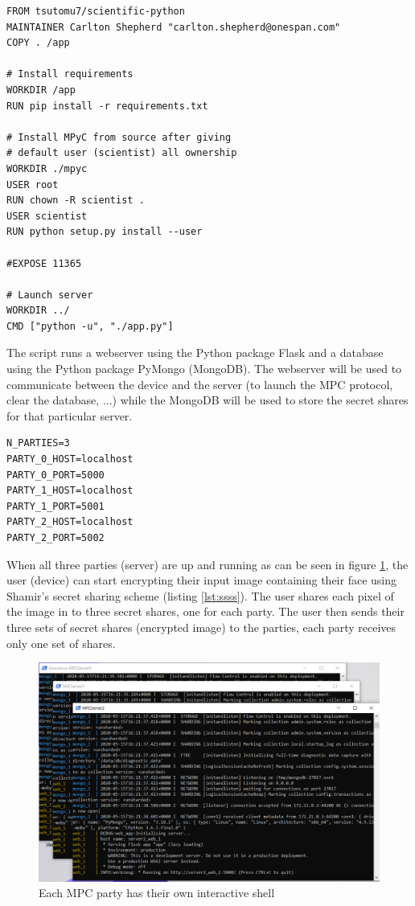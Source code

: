 \begin{lstlisting}[caption={Docker files for servers}, label={lst:docker}, frame=single]
FROM tsutomu7/scientific-python
MAINTAINER Carlton Shepherd "carlton.shepherd@onespan.com"
COPY . /app

# Install requirements
WORKDIR /app
RUN pip install -r requirements.txt

# Install MPyC from source after giving
# default user (scientist) all ownership
WORKDIR ./mpyc
USER root
RUN chown -R scientist .
USER scientist
RUN python setup.py install --user

#EXPOSE 11365

# Launch server
WORKDIR ../
CMD ["python -u", "./app.py"]
\end{lstlisting}

The  script runs a webserver using the Python package Flask and a database using the Python package PyMongo (MongoDB). The webserver will be used to communicate between the device and the server (to launch the MPC protocol, clear the database, ...) while the MongoDB will be used to store the secret shares for that particular server.

\begin{lstlisting}[caption={Environment file for servers}, label={lst:env}, frame=single]
N_PARTIES=3
PARTY_0_HOST=localhost
PARTY_0_PORT=5000
PARTY_1_HOST=localhost
PARTY_1_PORT=5001
PARTY_2_HOST=localhost
PARTY_2_PORT=5002
\end{lstlisting}

When all three parties (server) are up and running as can be seen in figure \ref{fig:mpc_shells}, the user (device) can start encrypting their input image containing their face using Shamir's secret sharing scheme (listing \ref{lst:ssss}). The user shares each pixel of the image in to three secret shares, one for each party. The user then sends their three sets of secret shares (encrypted image) to the parties, each party receives only one set of shares.

\begin{figure}[H]
  \includegraphics[scale=0.5]{fig/mpc_shells.png}
  \centering
  \caption{Each MPC party has their own interactive shell}
  \label{fig:mpc_shells}
\end{figure}

